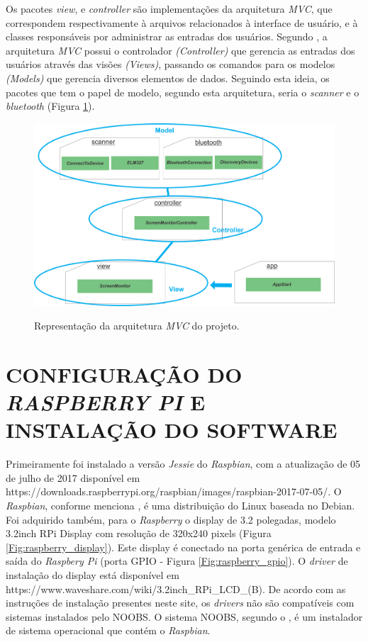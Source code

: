 Os pacotes \textit{view}, e \textit{controller} são implementações da arquitetura \textit{MVC}, que correspondem respectivamente à arquivos relacionados à interface de usuário, e à classes responsáveis por administrar as entradas dos usuários. Segundo , a arquitetura \textit{MVC} possui o controlador \textit{(Controller)} que gerencia as entradas dos usuários através das visões \textit{(Views)}, passando os comandos para os modelos \textit{(Models)} que gerencia diversos elementos de dados. Seguindo esta ideia, os pacotes que tem o papel de modelo, segundo esta arquitetura, seria o \textit{scanner} e o \textit{bluetooth} (Figura \ref{Fig:diagrama_mvc}).

\begin{figure}[!ht]
\centering
\caption{Representação da arquitetura \textit{MVC} do projeto.} 
{\includegraphics[scale=.40]{imagens/diagramaMvc.png}}\\
 \label{Fig:diagrama_mvc}
\end{figure}

\section{CONFIGURAÇÃO DO \textit{RASPBERRY PI} E INSTALAÇÃO DO SOFTWARE}
Primeiramente foi instalado a versão \textit{Jessie} do \textit{Raspbian}, com a atualização de 05 de julho de 2017 disponível em https://downloads.raspberrypi.org/raspbian/images/raspbian-2017-07-05/. O \textit{Raspbian}, conforme menciona , é uma distribuição do Linux baseada no Debian. Foi adquirido também, para o \textit{Raspberry} o display de 3.2 polegadas, modelo 3.2inch RPi Display com resolução de 320x240 pixels (Figura \ref{Fig:raspberry_display}). Este display é conectado na porta genérica de entrada e saída do \textit{Raspbery Pi} (porta GPIO - Figura \ref{Fig:raspberry_gpio}). O \textit{driver} de instalação do display está disponível em https://www.waveshare.com/wiki/3.2inch\_RPi\_LCD\_(B). De acordo com as instruções de instalação presentes neste site, os \textit{drivers} não são compatíveis com sistemas instalados pelo NOOBS. O sistema NOOBS, segundo o \citeauthor{raspberrypifoundation}, é um instalador de sistema operacional que contém o \textit{Raspbian}.

